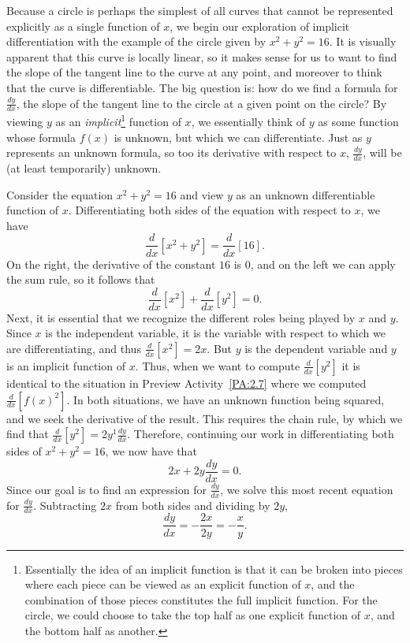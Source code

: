 Because a circle is perhaps the simplest of all curves that cannot be represented explicitly as a single function of $x$, we begin our exploration of implicit differentiation with the example of the circle given by $x^2 + y^2 = 16.$  It is visually apparent that this curve is locally linear, so it makes sense for us to want to find the slope of the tangent line to the curve at any point, and moreover to think that the curve is differentiable.  The big question is:  how do we find a formula for $\frac{dy}{dx}$, the slope of the tangent line to the circle at a given point on the circle?  By viewing $y$ as an \emph{implicit}\footnote{Essentially the idea of an implicit function is that it can be broken into pieces where each piece can be viewed as an explicit function of $x$, and the combination of those pieces constitutes the full implicit function.  For the circle, we could choose to take the top half as one explicit function of $x$, and the bottom half as another.}  function of $x$, we essentially think of $y$ as some function whose formula $f(x)$ is unknown, but which we can differentiate.  Just as $y$ represents an unknown formula, so too its derivative with respect to $x$, $\frac{dy}{dx}$, will be (at least temporarily) unknown.

Consider the equation $x^2 + y^2 = 16$ and view $y$ as an unknown differentiable function of $x$.  Differentiating both sides of the equation with respect to $x$, we have 
$$\frac{d}{dx} \left[ x^2 + y^2 \right] = \frac{d}{dx} \left[ 16 \right].$$
On the right, the derivative of the constant $16$ is $0$, and on the left we can apply the sum rule, so it follows that
$$\frac{d}{dx} \left[ x^2 \right]  + \frac{d}{dx} \left[ y^2 \right] = 0.$$
Next, it is essential that we recognize the different roles being played by $x$ and $y$.  Since $x$ is the independent variable, it is the variable with respect to which we are differentiating, and thus $\frac{d}{dx} \left[x^2\right] = 2x.$  But $y$ is the dependent variable and $y$ is an implicit function of $x$.  Thus, when we want to compute $\frac{d}{dx}[y^2]$ it is identical to the situation in Preview Activity~\ref{PA:2.7} where we computed $\frac{d}{dx}[f(x)^2]$.  In both situations, we have an unknown function being squared, and we seek the derivative of the result.  This requires the chain rule, by which we find that $\frac{d}{dx}[y^2] = 2y^1 \frac{dy}{dx}.$  Therefore, continuing our work in differentiating both sides of $x^2 + y^2 = 16$, we now have that
$$2x + 2y \frac{dy}{dx} = 0.$$
Since our goal is to find an expression for $\frac{dy}{dx}$, we solve this most recent equation for $\frac{dy}{dx}$.  Subtracting $2x$ from both sides and dividing by $2y$,
$$\frac{dy}{dx} = -\frac{2x}{2y} = -\frac{x}{y}.$$


